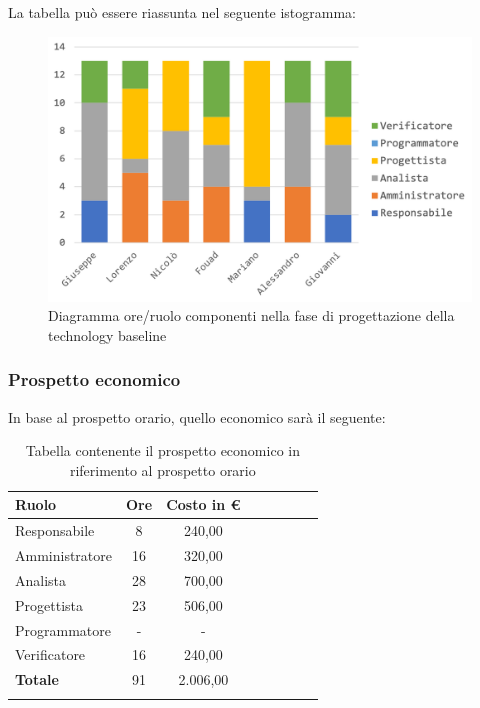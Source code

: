 		La tabella può essere riassunta nel seguente istogramma:
		\begin{figure}[H]
			\centering
			\includegraphics[width=0.8\linewidth]{./images/preventivo/progArch1.png}
			\caption{Diagramma ore/ruolo componenti nella fase di progettazione della technology baseline}
			\label{fig:diagramma suddivione ruoli fase progettazione della technology baseline}
		\end{figure}
	
		\subsubsection{Prospetto economico}
		In base al prospetto orario, quello economico sarà il seguente: 
		
		\begin{longtable}{|l|c|c|c|c|c|c|c|}
			\hline
			\rowcolor{lighter-grayer}
			\textbf{Ruolo} & \textbf{Ore} & \textbf{Costo in € } \\
			\hline
			\endfirsthead
			
			\hline
			Responsabile 	    & 8 & 240,00\\
			\hline 
			\hline
			Amministratore	  & 16 & 320,00\\
			\hline
			\hline
			Analista 				& 28 & 700,00\\
			\hline
			\hline
			Progettista 		  & 23 & 506,00\\
			\hline
			\hline
			Programmatore 	 & - & -\\
			\hline
			\hline
			Verificatore 		  & 16 & 240,00\\
			\hline
			\textbf{Totale} 	& 91 & 2.006,00\\
			\hline
			\caption{Tabella contenente il prospetto economico in riferimento al prospetto orario}
		\end{longtable}
		\pagebreak
		
